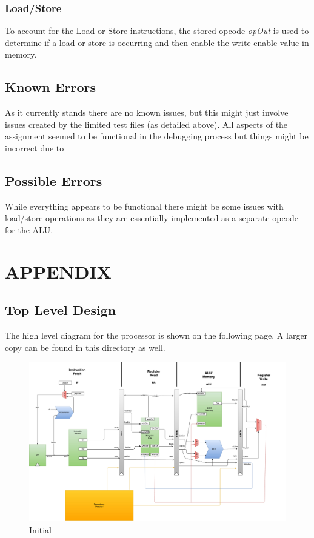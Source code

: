 \documentclass[conference]{IEEEtran}
\begin{document}
\subsubsection{Load/Store}
To account for the Load or Store instructions, the stored opcode \textit{opOut} is 
used to determine if a load or store is occurring and then enable the write enable
value in memory. 

\subsection{Known Errors}
As it currently stands there are no known issues, but this might just involve issues 
created by the limited test files (as detailed above). All aspects of the assignment
seemed to be functional in the debugging process but things might be incorrect due
to 

\subsection{Possible Errors}
While everything appears to be functional there might be some issues with load/store
 operations as they are essentially implemented as a separate opcode for the ALU. 


\section{APPENDIX}
\subsection{Top Level Design}
The high level diagram for the processor is shown on the following page. A larger copy can be found in this directory as well. 

\clearpage

\begin{figure}
\centering
\includegraphics[scale=0.33]{DraftDesign.pdf}
\caption{Initial }
\label{Design Draft}
\end{figure}
\end{document}
